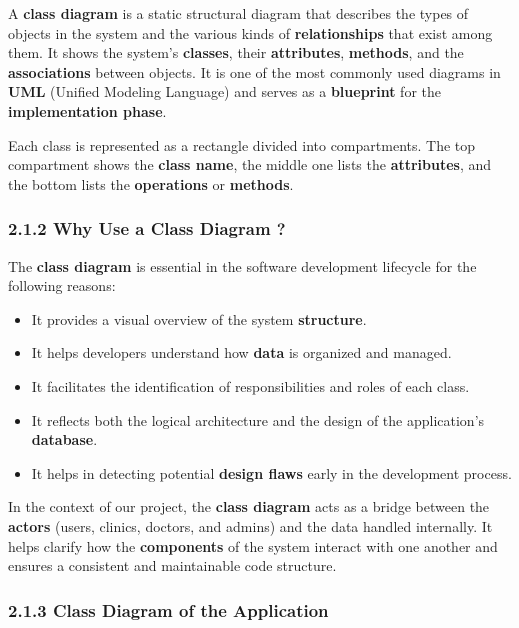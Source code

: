 \documentclass[12pt]{report}
\begin{document}
A \textbf{class diagram} is a static structural diagram that describes the types of objects in the system and the various kinds of \textbf{relationships} that exist among them. It shows the system's \textbf{classes}, their \textbf{attributes}, \textbf{methods}, and the \textbf{associations} between objects. It is one of the most commonly used diagrams in \textbf{UML} (Unified Modeling Language) and serves as a \textbf{blueprint} for the \textbf{implementation phase}.

\noindent Each class is represented as a rectangle divided into compartments. The top compartment shows the \textbf{class name}, the middle one lists the \textbf{attributes}, and the bottom lists the \textbf{operations} or \textbf{methods}.


\subsubsection*{2.1.2 Why Use a Class Diagram ?}
\vspace{0.1cm}


The \textbf{class diagram} is essential in the software development lifecycle for the following reasons:

\begin{itemize}
	\item It provides a visual overview of the system \textbf{structure}.
	\item It helps developers understand how \textbf{data} is organized and managed.
	\item It facilitates the identification of responsibilities and roles of each class.
	\item It reflects both the logical architecture and the design of the application's \textbf{database}.
	\item It helps in detecting potential \textbf{design flaws} early in the development process.
\end{itemize}

\noindent In the context of our project, the \textbf{class diagram} acts as a bridge between the \textbf{actors} (users, clinics, doctors, and admins) and the data handled internally. It helps clarify how the \textbf{components} of the system interact with one another and ensures a consistent and maintainable code structure.


\subsubsection*{2.1.3 Class Diagram of the Application}
\vspace{0.1cm}
\end{document}
